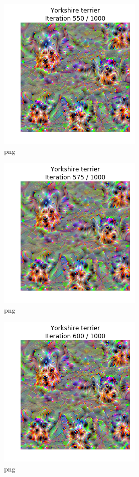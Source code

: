 \documentclass[]{book}
\theoremstyle{definition}
\theoremstyle{definition}
\theoremstyle{definition}
\theoremstyle{remark}
\begin{document}
\begin{figure}
\centering
\includegraphics{Network-Visualization-TensorFlow_files/Network-Visualization-TensorFlow_24_23.png}
\caption{png}
\end{figure}

\begin{figure}
\centering
\includegraphics{Network-Visualization-TensorFlow_files/Network-Visualization-TensorFlow_24_24.png}
\caption{png}
\end{figure}

\begin{figure}
\centering
\includegraphics{Network-Visualization-TensorFlow_files/Network-Visualization-TensorFlow_24_25.png}
\caption{png}
\end{figure}
\end{document}
